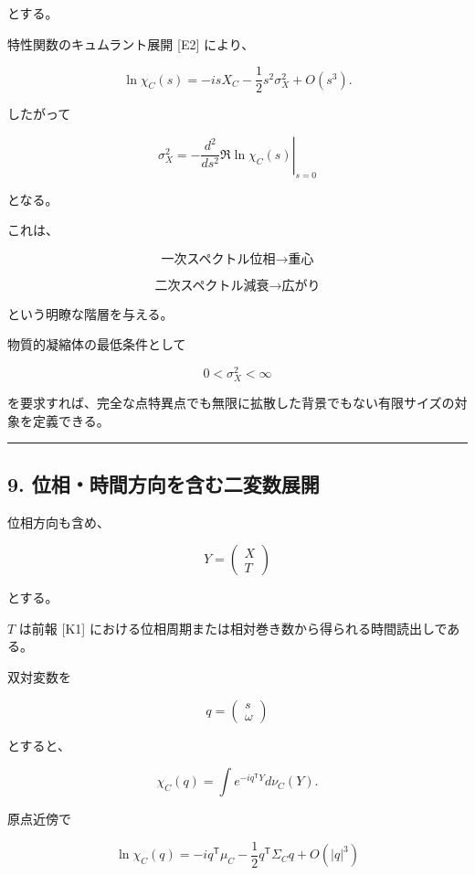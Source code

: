 \documentclass[
  a4paper,
]{ltjsarticle}
\begin{document}
とする。

特性関数のキュムラント展開 {[}E2{]} により、

\[
\ln\chi_C(s)
=
-isX_C
-
\frac12
s^2\sigma_X^2
+
O(s^3).
\tag{23}
\]

したがって

\[
\boxed{
\sigma_X^2
=
-
\left.
\frac{d^2}{ds^2}
\Re\ln\chi_C(s)
\right|_{s=0}
}
\tag{24}
\]

となる。

これは、

\[
\boxed{
\text{一次スペクトル位相}
\longrightarrow
\text{重心}
}
\]

\[
\boxed{
\text{二次スペクトル減衰}
\longrightarrow
\text{広がり}
}
\]

という明瞭な階層を与える。

物質的凝縮体の最低条件として

\[
0<\sigma_X^2<\infty
\tag{25}
\]

を要求すれば、完全な点特異点でも無限に拡散した背景でもない有限サイズの対象を定義できる。

\begin{center}\rule{0.5\linewidth}{0.5pt}\end{center}

\subsection{9.
位相・時間方向を含む二変数展開}\label{ux4f4dux76f8ux6642ux9593ux65b9ux5411ux3092ux542bux3080ux4e8cux5909ux6570ux5c55ux958b}

位相方向も含め、

\[
Y=
\begin{pmatrix}
X\\
T
\end{pmatrix}
\]

とする。

\(T\) は前報 {[}K1{]}
における位相周期または相対巻き数から得られる時間読出しである。

双対変数を

\[
q=
\begin{pmatrix}
s\\
\omega
\end{pmatrix}
\]

とすると、

\[
\chi_C(q)
=
\int
 e^{-iq^{\mathsf T}Y}
d\nu_C(Y).
\tag{26}
\]

原点近傍で

\[
\boxed{
\ln\chi_C(q)
=
-iq^{\mathsf T}\mu_C
-
\frac12
q^{\mathsf T}
\Sigma_C
q
+
O(|q|^3)
}
\tag{27}
\]
\end{document}
